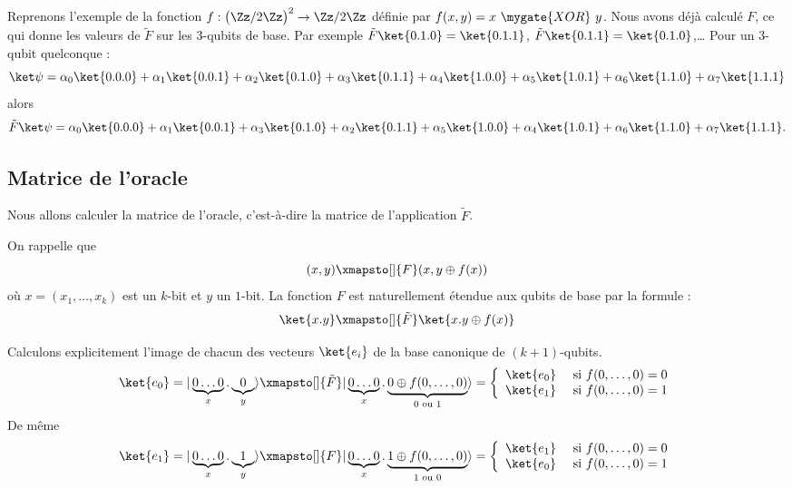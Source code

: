 \documentclass[11pt,class=report,crop=false]{standalone}
\begin{document}
\begin{exemple} 
Reprenons l'exemple de la fonction 
$f : \big(\Zz/2\Zz\big)^2 \to \Zz/2\Zz$ définie par $f(x,y) = x\ \mygate{XOR}\ y$.
Nous avons déjà calculé $F$, ce qui donne les valeurs de $\tilde F$ sur les $3$-qubits de base. Par exemple $\tilde F \ket{0.1.0} = \ket{0.1.1}$, $\tilde F \ket{0.1.1} = \ket{0.1.0}$,\ldots{} 
Pour un $3$-qubit quelconque :
$$\ket\psi = 
  \alpha_0 \ket{0.0.0} + \alpha_1 \ket{0.0.1} 
+ \alpha_2 \ket{0.1.0} + \alpha_3 \ket{0.1.1} 
+ \alpha_4 \ket{1.0.0} + \alpha_5 \ket{1.0.1} 
+ \alpha_6 \ket{1.1.0} + \alpha_7 \ket{1.1.1}
$$
alors
$$\tilde F \ket\psi = 
  \alpha_0 \ket{0.0.0} + \alpha_1 \ket{0.0.1} 
+ \alpha_3 \ket{0.1.0} + \alpha_2 \ket{0.1.1} 
+ \alpha_5 \ket{1.0.0} + \alpha_4 \ket{1.0.1} 
+ \alpha_6 \ket{1.1.0} + \alpha_7 \ket{1.1.1}.
$$
\end{exemple}
\subsection{Matrice de l'oracle}

Nous allons calculer la matrice de l'oracle, c'est-à-dire la matrice de l'application $\tilde F$.

On rappelle que 
$$(x,y) \xmapsto[]{F} (x,y\oplus f(x))$$
où $x=(x_1,\ldots,x_k)$ est un $k$-bit et $y$ un $1$-bit.
La fonction $F$ est naturellement étendue aux qubits de base par la formule :
$$\ket{x.y} \xmapsto[]{\tilde F} \ket{x.y\oplus f(x)}$$

Calculons explicitement l'image de chacun des vecteurs $\ket{e_i}$ de la base canonique de $(k+1)$-qubits.
$$\ket{e_0} = | \underbrace{0 \ldots 0}_{x} . \underbrace{0}_{y} \rangle
\xmapsto[]{\tilde F} | \underbrace{0 \ldots 0}_{x}.\underbrace{0\oplus f(0,\ldots,0)}_{0 \text{ ou } 1} \rangle
= \left\{ 
\begin{array}{cl}
\ket{e_0} & \text{ si } f(0,\ldots,0) = 0 \\
\ket{e_1} & \text{ si } f(0,\ldots,0) = 1 \\
\end{array}
\right.$$
De même 
$$\ket{e_1} = | \underbrace{0 \ldots 0}_{x} . \underbrace{1}_{y} \rangle
\xmapsto[]{F} | \underbrace{0 \ldots 0}_{x}.\underbrace{1\oplus f(0,\ldots,0)}_{1 \text{ ou } 0} \rangle
= \left\{ 
\begin{array}{cl}
\ket{e_1} & \text{ si } f(0,\ldots,0) = 0 \\
\ket{e_0} & \text{ si } f(0,\ldots,0) = 1 \\
\end{array}
\right.$$
\end{document}
